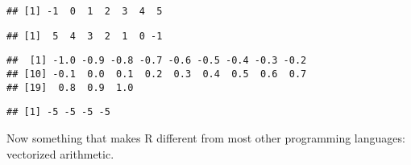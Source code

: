 \documentclass[paper=a4,10pt,div=17,headsepline,BCOR=12mm,twoside,open=right]{scrbook}\usepackage{knitr}
\begin{document}
\begin{knitrout}\footnotesize
{}\color{fgcolor}\begin{kframe}
\begin{alltt}
 \hlkwb{<-} \hlopt{-}\hlopt{:}
\end{alltt}
\begin{verbatim}
## [1] -1  0  1  2  3  4  5
\end{verbatim}
\begin{alltt}
 \hlkwb{<-} \hlopt{:-}
\end{alltt}
\begin{verbatim}
## [1]  5  4  3  2  1  0 -1
\end{verbatim}
\begin{alltt}
 \hlkwb{<-} \hlstd{(} \hlstd{=} \hlopt{-}\hlstd{,}  \hlstd{=} \hlstd{,}  \hlstd{=} \hlstd{)}
\end{alltt}
\begin{verbatim}
##  [1] -1.0 -0.9 -0.8 -0.7 -0.6 -0.5 -0.4 -0.3 -0.2
## [10] -0.1  0.0  0.1  0.2  0.3  0.4  0.5  0.6  0.7
## [19]  0.8  0.9  1.0
\end{verbatim}
\begin{alltt}
 \hlkwb{<-} \hlstd{(}\hlopt{-}\hlstd{,} \hlstd{)}
\end{alltt}
\begin{verbatim}
## [1] -5 -5 -5 -5
\end{verbatim}
\end{kframe}
\end{knitrout}

Now something that makes R different from most other programming languages: vectorized arithmetic.
\end{document}
